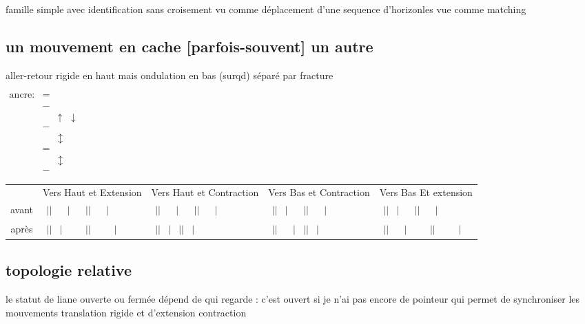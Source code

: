 \documentclass{article}
\begin{document}
famille simple avec identification sans croisement vu comme déplacement  d'une sequence d'horizonles vue comme matching

\subsection{un mouvement en cache [parfois-souvent] un autre}
aller-retour rigide en haut mais  ondulation  en bas (surqd)  séparé par fracture 

$
\begin{matrix}
\text {ancre:} &  =  &&\\
\\
&-\\
&&\uparrow&\downarrow \\ 
&-\\
&&\updownarrow\\
&=
\\
&&\updownarrow\\
&-
\end{matrix}$

\begin{tabular}{cllll}
&Vers Haut et Extension&Vers Haut et Contraction&Vers Bas et Contraction&Vers Bas Et extension\\
avant& 
$\begin{matrix}||&&|&&||&&|\end{matrix}$ &
$\begin{matrix}||&&|&&||&&|\end{matrix}$ &
$\begin{matrix}||&|&&||&&|\end{matrix}$&
$\begin{matrix}||&|&&||&&|\end{matrix}$& \\
après& $\begin{matrix}||&|&&&||&&&|\end{matrix}$ & 
$\begin{matrix}||&|&||&|\end{matrix}$ & %
 $\begin{matrix}||&&|&||&|\end{matrix}$&
 $\begin{matrix}||&&|&&&||&&&|\end{matrix}$\\
\end{tabular}

\subsection{topologie relative}
le statut de  liane  ouverte ou fermée  dépend de qui regarde : c'est ouvert si je n'ai pas encore de pointeur qui permet de synchroniser les  mouvements translation rigide  et d'extension contraction %
\end{document}
